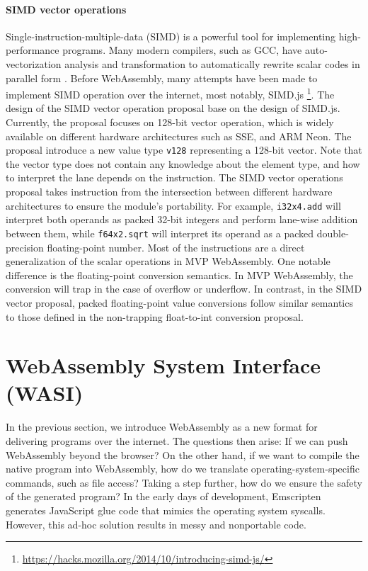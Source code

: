 \paragraph{SIMD vector operations}
Single-instruction-multiple-data (SIMD) is a powerful tool for implementing high-performance programs. Many modern compilers, such as GCC, have auto-vectorization analysis and transformation to automatically rewrite scalar codes in parallel form \cite{auto-vec-gcc}. Before WebAssembly, many attempts have been made to implement SIMD operation over the internet, most notably, SIMD.js \footnote{\url{https://hacks.mozilla.org/2014/10/introducing-simd-js/}}. The design of the SIMD vector operation proposal base on the design of SIMD.js. Currently, the proposal focuses on 128-bit vector operation, which is widely available on different hardware architectures such as SSE\cite{sse-intel}, and ARM Neon\cite{arm-neon}. The proposal introduce a new value type \texttt{v128} representing a 128-bit vector. Note that the vector type does not contain any knowledge about the element type, and how to interpret the lane depends on the instruction. The SIMD vector operations proposal takes instruction from the intersection between different hardware architectures to ensure the module's portability. For example, \texttt{i32x4.add} will interpret both operands as packed 32-bit integers and perform lane-wise addition between them, while \texttt{f64x2.sqrt} will interpret its operand as a packed double-precision floating-point number. Most of the instructions are a direct generalization of the scalar operations in MVP WebAssembly. One notable difference is the floating-point conversion semantics. In MVP WebAssembly, the conversion will trap in the case of overflow or underflow. In contrast, in the SIMD vector proposal, packed floating-point value conversions follow similar semantics to those defined in the non-trapping float-to-int conversion proposal.

\section{WebAssembly System Interface (WASI)}

In the previous section, we introduce WebAssembly as a new format for delivering programs over the internet. The questions then arise: If we can push WebAssembly beyond the browser? On the other hand, if we want to compile the native program into WebAssembly, how do we translate operating-system-specific commands, such as file access? Taking a step further, how do we ensure the safety of the generated program? In the early days of development, Emscripten generates JavaScript glue code that mimics the operating system syscalls. However, this ad-hoc solution results in messy and nonportable code.

